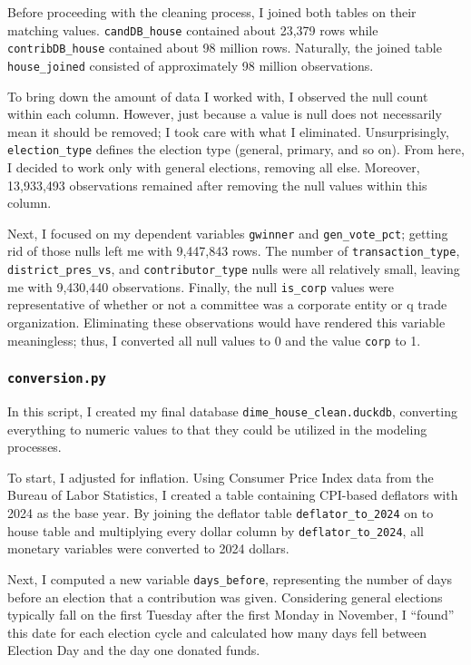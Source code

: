 Before proceeding with the cleaning process, I joined both tables on their matching values. {\tt candDB\_house} contained about 23,379 rows while {\tt contribDB\_house} contained about 98 million rows. Naturally, the joined table {\tt house\_joined} consisted of approximately 98 million observations. 

To bring down the amount of data I worked with, I observed the null count within each column. However, just because a value is null does not necessarily mean it should be removed; I took care with what I eliminated. Unsurprisingly, {\tt election\_type} defines the election type (general, primary, and so on). From here, I decided to work only with general elections, removing all else. Moreover, 13,933,493 observations remained after removing the null values within this column.

Next, I focused on my dependent variables {\tt gwinner} and {\tt gen\_vote\_pct}; getting rid of those nulls left me with 9,447,843 rows. The number of {\tt transaction\_type}, {\tt district\_pres\_vs}, and {\tt contributor\_type} nulls were all relatively small, leaving me with 9,430,440 observations. Finally, the null {\tt is\_corp} values were representative of whether or not a committee was a corporate entity or q trade organization. Eliminating these observations would have rendered this variable meaningless; thus, I converted all null values to 0 and the value {\tt corp} to 1.

\subsubsection*{\tt conversion.py}

In this script, I created my final database {\tt dime\_house\_clean.duckdb}, converting everything to numeric values to that they could be utilized in the modeling processes.

To start, I adjusted for inflation. Using Consumer Price Index data from the Bureau of Labor Statistics, I created a table containing CPI-based deflators with 2024 as the base year. By joining the deflator table {\tt deflator\_to\_2024} on to house table and multiplying every dollar column by {\tt deflator\_to\_2024}, all monetary variables were converted to 2024 dollars.

Next, I computed a new variable {\tt days\_before}, representing the number of days before an election that a contribution was given. Considering general elections typically fall on the first Tuesday after the first Monday in November, I ``found'' this date for each election cycle and calculated how many days fell between Election Day and the day one donated funds.


